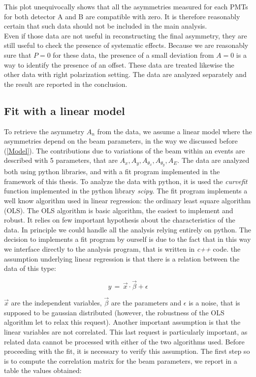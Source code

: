 This plot unequivocally shows that all the asymmetries measured for each PMTs for both detector A and B are compatible with zero. It is therefore reasonably certain that such data should not be included in the main analysis.\\
Even if those data are not useful in reconstructing the final asymmetry, they are still useful to check the presence of systematic effects. Because we are reasonably sure that $P = 0$ for these data, the presence of a small deviation from $A = 0$ is a way to identify the presence of an offset. These data are treated likewise the other data with right polarization setting. The data are analyzed separately and the result are reported in the conclusion. 

\subsection{Fit with a linear model}

To retrieve the asymmetry $A_{n}$ from the data, we assume a linear model where the asymmetries depend on the beam parameters, in the way we discussed before (\ref{Model}). The contributions due to variations of the beam within an events are described with 5 parameters, that are  $A_{x},A_{y},A_{\theta_{x}},A_{\theta_{y}},A_{E}$.
The data are analyzed both using python libraries, and with a fit program implemented in the framework of this thesis. To analyze the data with python, it is used the \textit{curvefit} function implemented in the python library \textit{scipy}.
The fit program implements a well know algorithm used in linear regression: the ordinary least square algorithm (OLS).
The OLS algorithm is basic algorithm, the easiest to implement and robust. It relies on few important hypothesis about the characteristics of the data. In principle we could handle all the analysis relying entirely on python. The decision to implements a fit program by ourself is due to the fact that in this way we interface directly to the analysis program, that is written in \textit{c++} code. 
the assumption underlying linear regression is that there is a relation between the data of this type:

\begin{equation}
 y \, = \, \vec{x} \cdot \vec{\beta} + \epsilon
\end{equation}

$\vec{x}$ are the independent variables, $\vec{\beta}$ are the parameters and $\epsilon$ is a noise, that is supposed to be gaussian distributed (however, the robustness of the OLS algorithm let to relax this request). Another important assumption is that the linear variables are not correlated. 
This last request is particularly important, as related data cannot be processed with either of the two algorithms used.
Before proceeding with the fit, it is necessary to verify this assumption. \medskip
The first step so is to compute the correlation matrix for the beam parameters, we report in a table the values obtained:

